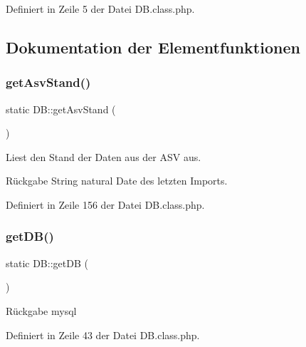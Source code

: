 Definiert in Zeile 5 der Datei D\+B.\+class.\+php.



\subsection{Dokumentation der Elementfunktionen}
\mbox{\label{class_d_b_a1ebd9dfeb83ffaddd5ae46689586b63d}} 
\subsubsection{\texorpdfstring{get\+Asv\+Stand()}{getAsvStand()}}
{\footnotesize\ttfamily static D\+B\+::get\+Asv\+Stand (\begin{DoxyParamCaption}{ }\end{DoxyParamCaption})\hspace{0.3cm}{\ttfamily [static]}}

Liest den Stand der Daten aus der A\+SV aus. \begin{DoxyReturn}{Rückgabe}
String natural Date des letzten Imports. 
\end{DoxyReturn}


Definiert in Zeile 156 der Datei D\+B.\+class.\+php.

\mbox{\label{class_d_b_a1f39c0489afad64328534850308fc9a9}} 
\subsubsection{\texorpdfstring{get\+D\+B()}{getDB()}}
{\footnotesize\ttfamily static D\+B\+::get\+DB (\begin{DoxyParamCaption}{ }\end{DoxyParamCaption})\hspace{0.3cm}{\ttfamily [static]}}

\begin{DoxyReturn}{Rückgabe}
mysql 
\end{DoxyReturn}


Definiert in Zeile 43 der Datei D\+B.\+class.\+php.

\mbox{\label{class_d_b_a0eb830294949a623b79351601949a673}} 
